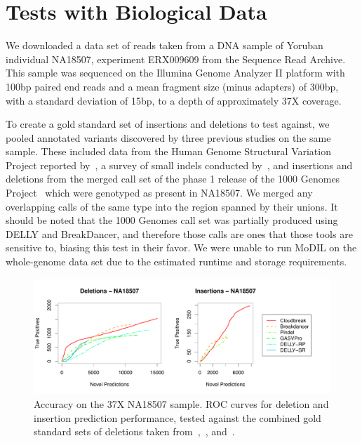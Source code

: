 \section{Tests with Biological Data}\label{section_na18507}

We downloaded a data set of reads taken from a DNA sample of Yoruban individual NA18507, experiment ERX009609 from the Sequence Read Archive. This sample was sequenced on the Illumina Genome Analyzer II platform with 100bp paired end reads and a mean fragment size (minus adapters) of 300bp, with a standard deviation of 15bp, to a depth of approximately 37X coverage.

To create a gold standard set of insertions and deletions to test against, we pooled annotated variants discovered by three previous studies on the same sample. These included data from the Human Genome Structural Variation Project reported by~\cite{Kidd:2008p926}, a survey of small indels conducted by~\cite{Mills:2011fi}, and insertions and deletions from the merged call set of the phase 1 release of the 1000 Genomes Project~\cite{GenomesProjectConsortium:2012co} which were genotyped as present in NA18507. We merged any overlapping calls of the same type into the region spanned by their unions. It should be noted that the 1000 Genomes call set was partially produced using DELLY and BreakDancer, and therefore those calls are ones that those tools are sensitive to, biasing this test in their favor. We were unable to run MoDIL on the whole-genome data set due to the estimated runtime and storage requirements.

\begin{figure}
\centering
\includegraphics[width=1\textwidth]{figures/NA18507_COMBINED_ROCS_POSTER.pdf}
\caption{Accuracy on the 37X NA18507 sample. ROC curves for deletion and insertion prediction performance, tested against the combined gold standard sets of deletions taken from~\cite{Kidd:2008p926},~\cite{Mills:2011fi}, and~\cite{GenomesProjectConsortium:2012co}.}
\label{NA18507CombinedRoc}
\end{figure}

